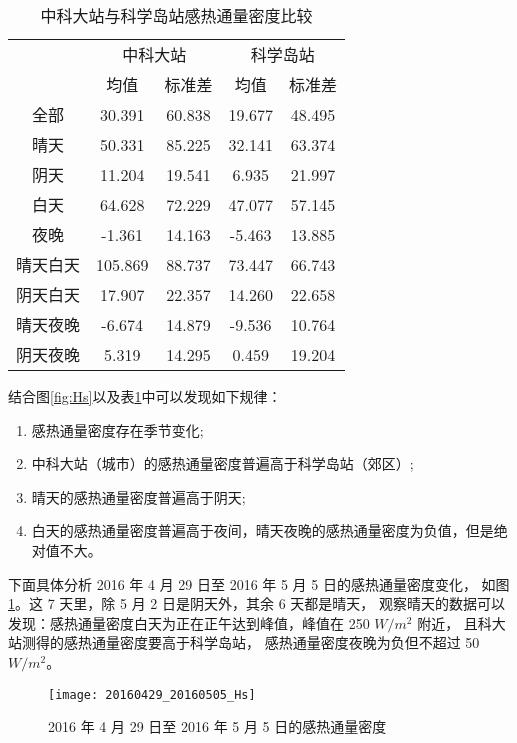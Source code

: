 \begin{table}[H]
\centering
\caption{中科大站与科学岛站感热通量密度比较}\label{tab:Hs}
\begin{tabular}{ccccc}
  \toprule
  & \multicolumn{2}{c}{中科大站} & \multicolumn{2}{c}{科学岛站}\\
  \cmidrule(r){2-3} \cmidrule(r){4-5}
  & 均值 & 标准差 & 均值 & 标准差\\
  \midrule
  全部 & 30.391 & 60.838 & 19.677 & 48.495\\
  晴天 & 50.331 & 85.225 & 32.141 & 63.374\\
  阴天 & 11.204 & 19.541 & 6.935 & 21.997\\
  白天 & 64.628 & 72.229 & 47.077 & 57.145\\
  夜晚 & -1.361 & 14.163 & -5.463 & 13.885\\
  晴天白天 & 105.869 & 88.737 & 73.447 & 66.743\\
  阴天白天 & 17.907 & 22.357 & 14.260 & 22.658\\
  晴天夜晚 & -6.674 & 14.879 & -9.536 & 10.764\\
  阴天夜晚 & 5.319 & 14.295 & 0.459 & 19.204\\
  \bottomrule
\end{tabular}
\end{table}
结合图\ref{fig:Hs}以及表\ref{tab:Hs}中可以发现如下规律：
\begin{enumerate}
\item 感热通量密度存在季节变化;
\item 中科大站（城市）的感热通量密度普遍高于科学岛站（郊区）;
\item 晴天的感热通量密度普遍高于阴天;
\item 白天的感热通量密度普遍高于夜间，晴天夜晚的感热通量密度为负值，但是绝对值不大。
\end{enumerate}
下面具体分析 2016 年 4 月 29 日至 2016 年 5 月 5 日的感热通量密度变化，
如图\ref{fig:20160429_20160505_Hs}。这 7 天里，除 5 月 2 日是阴天外，其余 6 天都是晴天，
观察晴天的数据可以发现：感热通量密度白天为正在正午达到峰值，峰值在 250 $W/m^{2}$ 附近，
且科大站测得的感热通量密度要高于科学岛站，
感热通量密度夜晚为负但不超过 50 $W/m^{2}$。
\begin{figure}[H]
\centering
\texttt{[image: 20160429\_20160505\_Hs]}
\caption{2016 年 4 月 29 日至 2016 年 5 月 5 日的感热通量密度}\label{fig:20160429_20160505_Hs}
\end{figure}


